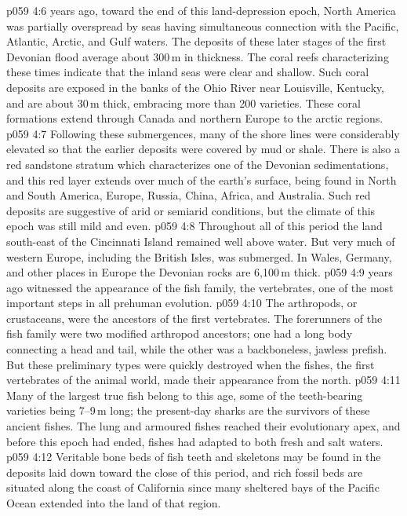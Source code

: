 \vs p059 4:6 \pc {} years ago, toward the end of this land\hyp{}depression epoch, North America was partially overspread by seas having simultaneous connection with the Pacific, Atlantic, Arctic, and Gulf waters. The deposits of these later stages of the first Devonian flood average about 300\,m in thickness. The coral reefs characterizing these times indicate that the inland seas were clear and shallow. Such coral deposits are exposed in the banks of the Ohio River near Louisville, Kentucky, and are about 30\,m thick, embracing more than 200 varieties. These coral formations extend through Canada and northern Europe to the arctic regions.
\vs p059 4:7 Following these submergences, many of the shore lines were considerably elevated so that the earlier deposits were covered by mud or shale. There is also a red sandstone stratum which characterizes one of the Devonian sedimentations, and this red layer extends over much of the earth’s surface, being found in North and South America, Europe, Russia, China, Africa, and Australia. Such red deposits are suggestive of arid or semiarid conditions, but the climate of this epoch was still mild and even.
\vs p059 4:8 Throughout all of this period the land south\hyp{}east of the Cincinnati Island remained well above water. But very much of western Europe, including the British Isles, was submerged. In Wales, Germany, and other places in Europe the Devonian rocks are 6,100\,m thick.
\vs p059 4:9 \pc {} years ago witnessed the appearance of the fish family, the vertebrates, one of the most important steps in all prehuman evolution.
\vs p059 4:10 The arthropods, or crustaceans, were the ancestors of the first vertebrates. The forerunners of the fish family were two modified arthropod ancestors; one had a long body connecting a head and tail, while the other was a backboneless, jawless prefish. But these preliminary types were quickly destroyed when the fishes, the first vertebrates of the animal world, made their  appearance from the north.
\vs p059 4:11 Many of the largest true fish belong to this age, some of the teeth\hyp{}bearing varieties being 7--9\,m long; the present\hyp{}day sharks are the survivors of these ancient fishes. The lung and armoured fishes reached their evolutionary apex, and before this epoch had ended, fishes had adapted to both fresh and salt waters.
\vs p059 4:12 Veritable bone beds of fish teeth and skeletons may be found in the deposits laid down toward the close of this period, and rich fossil beds are situated along the coast of California since many sheltered bays of the Pacific Ocean extended into the land of that region.
